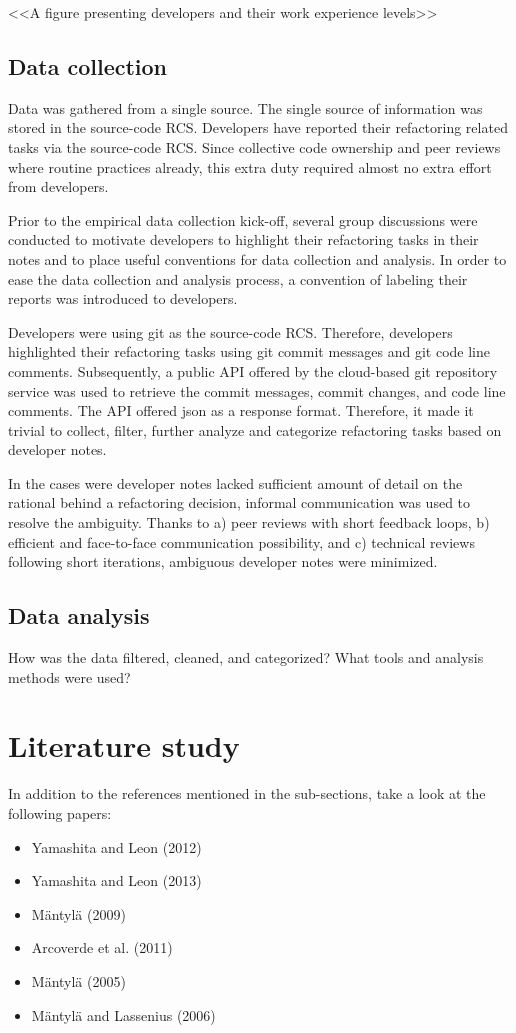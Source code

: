 \documentclass[english,12pt,a4paper,pdftex,sci,utf8]{aaltothesis}
\begin{document}
<<A figure presenting developers and their work experience levels>>

\subsection{Data collection} \label{data collection}
Data was gathered from a single source. The single source of information was stored in the source-code \gls{RCS}. Developers have reported their refactoring related tasks via the source-code \gls{RCS}. Since collective code ownership and peer reviews where routine practices already, this extra duty required almost no extra effort from developers. 

Prior to the empirical data collection kick-off, several group discussions were conducted to motivate developers to highlight their refactoring tasks in their notes and to place useful conventions for data collection and analysis. In order to ease the data collection and analysis process, a convention of labeling their reports was introduced to developers.

Developers were using git as the source-code \gls{RCS}. Therefore, developers highlighted their refactoring tasks using git commit messages and git code line comments. Subsequently, a public API offered by the cloud-based git repository service was used to retrieve the commit messages, commit changes, and code line comments. The API offered json as a response format. Therefore, it made it trivial to collect, filter, further analyze and categorize refactoring tasks based on developer notes.  

In the cases were developer notes lacked sufficient amount of detail on the rational behind a refactoring decision, informal communication was used to resolve the ambiguity. Thanks to a) peer reviews with short feedback loops, b) efficient and face-to-face communication possibility, and c) technical reviews following short iterations, ambiguous developer notes were minimized. 

\subsection{Data analysis} \label{data analysis}
How was the data filtered, cleaned, and categorized? What tools and analysis methods were used?

\clearpage

\section{Literature study} \label{literature}
In addition to the references mentioned in the sub-sections, take a look at the following papers:
\begin{itemize}
\item Yamashita and Leon (2012)
\item Yamashita and Leon (2013)
\item Mäntylä (2009)
\item Arcoverde et al. (2011)
\item Mäntylä (2005)
\item Mäntylä and Lassenius (2006)
\end{itemize}
\end{document}
